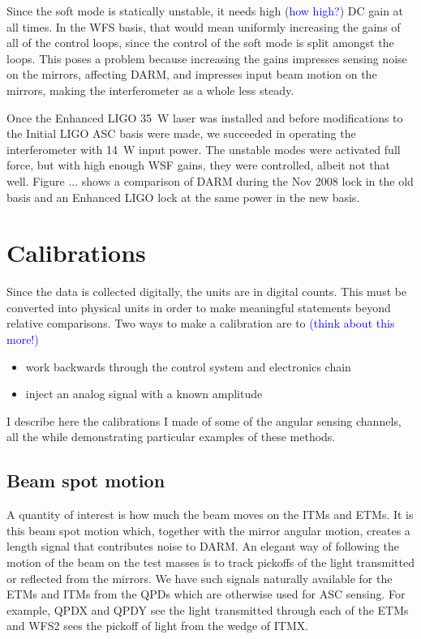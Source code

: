 Since the soft mode is statically unstable, it needs high
(\textcolor{blue}{how high?}) DC gain at all times. In the WFS basis,
that would mean uniformly increasing the gains of all of the control
loops, since the control of the soft mode is split amongst the
loops. This poses a problem because increasing the gains impresses
sensing noise on the mirrors, affecting DARM, and impresses input beam
motion on the mirrors, making the interferometer as a whole less
steady. 

Once the Enhanced LIGO 35~W laser was installed and before
modifications to the Initial LIGO ASC basis were made, we succeeded in
operating the interferometer with 14~W input power. The unstable modes
were activated full force, but with high enough WSF gains, they were
controlled, albeit not that well. Figure ... shows a comparison of
DARM during the Nov 2008 lock in the old basis and an Enhanced LIGO
lock at the same power in the new basis. 



\section{Calibrations}
Since the data is collected digitally, the units are in digital
counts. This must be converted into physical units in order to make
meaningful statements beyond relative comparisons. Two ways to make a
calibration are to \textcolor{blue}{(think about this more!)}
\begin{itemize}
\item work backwards through the control system and electronics chain \vspace{-10pt}
\item inject an analog signal with a known amplitude 
\end{itemize}
I describe here the calibrations I made of some of the angular sensing
channels, all the while demonstrating particular examples of these
methods.


\subsection{Beam spot motion}
A quantity of interest is how much the beam moves on the ITMs and
ETMs. It is this beam spot motion which, together with the mirror
angular motion, creates a length signal that contributes noise to
DARM. An elegant way of following the motion of the beam on the test
masses is to track pickoffs of the light transmitted or reflected from
the mirrors. We have such signals naturally available for the ETMs and
ITMs from the QPDs which are otherwise used for ASC sensing. For
example, QPDX and QPDY see the light transmitted through each of the
ETMs and WFS2 sees the pickoff of light from the wedge of ITMX.


